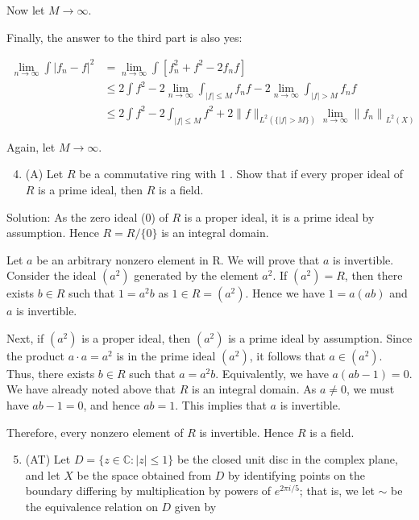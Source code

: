 \documentclass[10pt]{article}
\begin{document}
Now let $M \rightarrow \infty$.

Finally, the answer to the third part is also yes:

$$
\begin{aligned}
\lim _{n \rightarrow \infty} \int\left|f_{n}-f\right|^{2} & =\lim _{n \rightarrow \infty} \int\left[f_{n}^{2}+f^{2}-2 f_{n} f\right] \\
& \leq 2 \int f^{2}-2 \lim _{n \rightarrow \infty} \int_{|f| \leq M} f_{n} f-2 \lim _{n \rightarrow \infty} \int_{|f|>M} f_{n} f \\
& \leq 2 \int f^{2}-2 \int_{|f| \leq M} f^{2}+2\|f\|_{L^{2}(\{|f|>M\})} \lim _{n \rightarrow \infty}\left\|f_{n}\right\|_{L^{2}(X)}
\end{aligned}
$$

Again, let $M \rightarrow \infty$.

\begin{enumerate}
  \setcounter{enumi}{3}
  \item (A) Let $R$ be a commutative ring with 1 . Show that if every proper ideal of $R$ is a prime ideal, then $R$ is a field.
\end{enumerate}

Solution: As the zero ideal (0) of $R$ is a proper ideal, it is a prime ideal by assumption. Hence $R=R /\{0\}$ is an integral domain.

Let $a$ be an arbitrary nonzero element in R. We will prove that $a$ is invertible. Consider the ideal $\left(a^{2}\right)$ generated by the element $a^{2}$. If $\left(a^{2}\right)=R$, then there exists $b \in R$ such that $1=a^{2} b$ as $1 \in R=\left(a^{2}\right)$. Hence we have $1=a(a b)$ and $a$ is invertible.

Next, if $\left(a^{2}\right)$ is a proper ideal, then $\left(a^{2}\right)$ is a prime ideal by assumption. Since the product $a \cdot a=a^{2}$ is in the prime ideal $\left(a^{2}\right)$, it follows that $a \in\left(a^{2}\right)$. Thus, there exists $b \in R$ such that $a=a^{2} b$. Equivalently, we have $a(a b-1)=0$. We have already noted above that $R$ is an integral domain. As $a \neq 0$, we must have $a b-1=0$, and hence $a b=1$. This implies that $a$ is invertible.

Therefore, every nonzero element of $R$ is invertible. Hence $R$ is a field.

\begin{enumerate}
  \setcounter{enumi}{4}
  \item (AT) Let $D=\{z \in \mathbb{C}:|z| \leq 1\}$ be the closed unit disc in the complex plane, and let $X$ be the space obtained from $D$ by identifying points on the boundary differing by multiplication by powers of $e^{2 \pi i / 5}$; that is, we let $\sim$ be the equivalence relation on $D$ given by
\end{enumerate}
\end{document}
